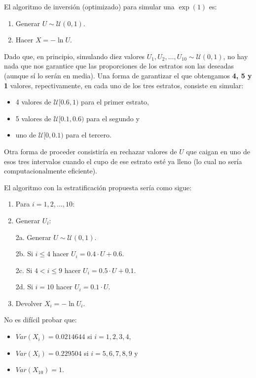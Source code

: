 \documentclass[
]{book}
\theoremstyle{break}
\theoremstyle{definition}
\theoremstyle{definition}
\theoremstyle{definition}
\theoremstyle{remark}
\begin{document}
El algoritmo de inversión (optimizado) para simular una \(\exp\left(1\right)\) es:

\begin{enumerate}
\def\labelenumi{\arabic{enumi}.}
\item
  Generar \(U\sim \mathcal{U}\left( 0,1\right)\).
\item
  Hacer \(X=-\ln U\).
\end{enumerate}

Dado que, en principio, simulando diez valores \(U_{1},U_{2},\ldots,U_{10}\sim \mathcal{U}\left( 0,1\right)\), no hay nada que nos garantice que las proporciones de los estratos son las deseadas (aunque sí lo serán en media).
Una forma de garantizar el que obtengamos \textbf{4, 5 y 1} valores, repectivamente, en cada uno de los tres estratos, consiste en simular:

\begin{itemize}
\item
  4 valores de \(\mathcal{U}[0.6,1)\) para el primer estrato,
\item
  5 valores de \(\mathcal{U}[0.1,0.6)\) para el segundo y
\item
  uno de \(\mathcal{U}[0,0.1)\) para el tercero.
\end{itemize}

Otra forma de proceder consistiría en rechazar valores de \(U\) que caigan en uno de esos tres intervalos cuando el cupo de ese estrato esté ya lleno (lo cual no sería computacionalmente eficiente).

El algoritmo con la estratificación propuesta sería como sigue:

\begin{enumerate}
\def\labelenumi{\arabic{enumi}.}
\item
  Para \(i=1,2,\ldots, 10\):
\item
  Generar \(U_{i}\):

  2a. Generar \(U\sim \mathcal{U}\left( 0,1\right)\).

  2b. Si \(i\leq4\) hacer \(U_{i} = 0.4 \cdot U + 0.6\).

  2c. Si \(4<i\leq9\) hacer \(U_{i} = 0.5 \cdot U + 0.1\).

  2d. Si \(i=10\) hacer \(U_{i} = 0.1 \cdot U\).
\item
  Devolver \(X_{i}=-\ln U_{i}\).
\end{enumerate}

No es difícil probar que:

\begin{itemize}
\item
  \(Var\left( X_{i}\right) = 0.0214644\) si \(i=1,2,3,4\),
\item
  \(Var\left( X_{i}\right) = 0.229504\) si \(i=5,6,7,8,9\) y
\item
  \(Var\left( X_{10}\right) = 1\).
\end{itemize}
\end{document}

